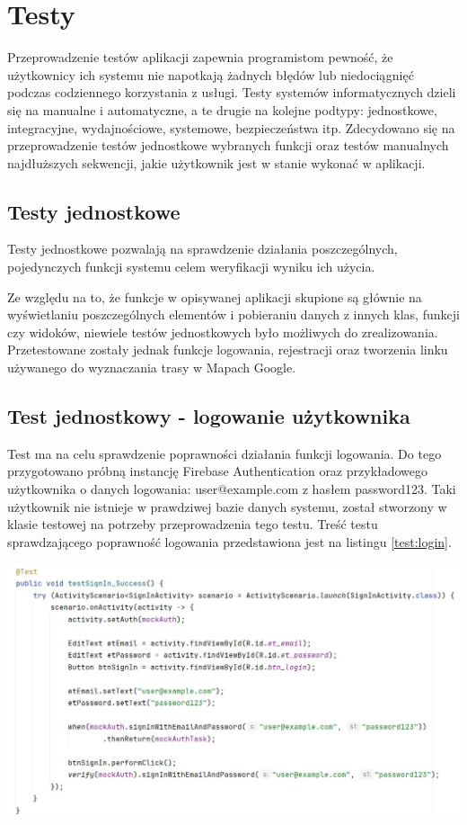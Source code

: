 \section{Testy}
Przeprowadzenie testów aplikacji zapewnia programistom pewność, że użytkownicy ich systemu nie napotkają żadnych błędów lub niedociągnięć podczas codziennego korzystania z usługi. Testy systemów informatycznych dzieli się na manualne i automatyczne, a te drugie na kolejne podtypy: jednostkowe, integracyjne, wydajnościowe, systemowe, bezpieczeństwa itp. Zdecydowano się na przeprowadzenie testów jednostkowe wybranych funkcji oraz testów manualnych najdłuższych sekwencji, jakie użytkownik jest w stanie wykonać w aplikacji.
\subsection{Testy jednostkowe}
Testy jednostkowe pozwalają na sprawdzenie działania poszczególnych, pojedynczych funkcji systemu celem weryfikacji wyniku ich użycia. \par
Ze względu na to, że funkcje w opisywanej aplikacji skupione są głównie na wyświetlaniu poszczególnych elementów i pobieraniu danych z innych klas, funkcji czy widoków, niewiele testów jednostkowych było możliwych do zrealizowania. Przetestowane zostały jednak funkcje logowania, rejestracji oraz tworzenia linku używanego do wyznaczania trasy w Mapach Google. 

\subsection*{Test jednostkowy - logowanie użytkownika}
Test ma na celu sprawdzenie poprawności działania funkcji logowania. Do tego przygotowano próbną instancję Firebase Authentication oraz przykładowego użytkownika o danych logowania: user@example.com z hasłem password123. Taki użytkownik nie istnieje w prawdziwej bazie danych systemu, został stworzony w klasie testowej na potrzeby  przeprowadzenia tego testu. Treść testu sprawdzającego poprawność logowania przedstawiona jest na listingu \ref{test:login}. \\

\noindent
\begin{minipage}{\linewidth}
    \label{test:login}
    \centering
    \includegraphics[width=0.8\linewidth]{img/test/test-login.jpg}
\end{minipage}
\\


